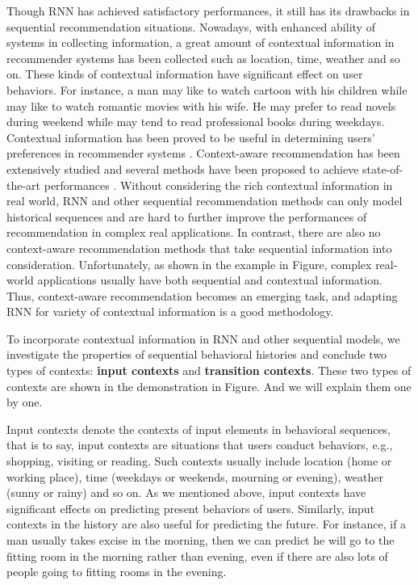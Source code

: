 \documentclass{sig-alternate}
\begin{document}
Though RNN has achieved satisfactory performances, it still has its drawbacks in sequential recommendation situations. Nowadays, with enhanced ability of systems in collecting information, a great amount of contextual information in recommender systems has been collected such as location, time, weather and so on. These kinds of contextual information have significant effect on user behaviors. For instance, a man may like to watch cartoon with his children while may like to watch romantic movies with his wife. He may prefer to read novels during weekend while may tend to read professional books during weekdays. Contextual information has been proved to be useful in determining users' preferences in recommender systems \cite{palmisano2008using,adomavicius2011context}. Context-aware recommendation has been extensively studied and several methods have been proposed to achieve state-of-the-art performances \cite{rendle2011fast,shi2012tfmap,jamali2013heteromf,shi2014cars,liu2015cot}. Without considering the rich contextual information in real world, RNN and other sequential recommendation methods can only model historical sequences and are hard to further improve the performances of recommendation in complex real applications. In contrast, there are also no context-aware recommendation methods that take sequential information into consideration. Unfortunately, as shown in the example in Figure, complex real-world applications usually have both sequential and contextual information. Thus, context-aware recommendation becomes an emerging task, and adapting RNN for variety of contextual information is a good methodology.

To incorporate contextual information in RNN and other sequential models, we investigate the properties of sequential behavioral histories and conclude two types of contexts: \textbf{input contexts} and \textbf{transition contexts}. These two types of contexts are shown in the demonstration in Figure. And we will explain them one by one.

Input contexts denote the contexts of input elements in behavioral sequences, that is to say, input contexts are situations that users conduct behaviors, e.g., shopping, visiting or reading. Such contexts usually include location (home or working place), time (weekdays or weekends, mourning or evening), weather (sunny or rainy) and so on. As we mentioned above, input contexts have significant effects on predicting present behaviors of users. Similarly, input contexts in the history are also useful for predicting the future. For instance, if a man usually takes excise in the morning, then we can predict he will go to the fitting room in the morning rather than evening, even if there are also lots of people going to fitting rooms in the evening.
\end{document}
